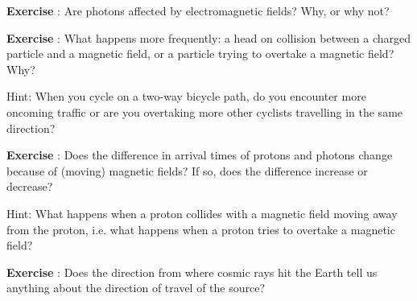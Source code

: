 \begin{shaded}
\textbf{Exercise \theExercise {}} : Are photons affected by electromagnetic fields? Why, or why not?\end{shaded}
\begin{shaded}
\textbf{Exercise \theExercise {}} : What happens more frequently: a head on collision between a charged particle and a magnetic field, or a particle trying to overtake a magnetic field? Why?

Hint: When you cycle on a two-way bicycle path, do you encounter more oncoming traffic or are you overtaking more other cyclists travelling in the same direction?
\end{shaded}
\begin{shaded}
\textbf{Exercise \theExercise {}} : Does the difference in arrival times of protons and photons change because of (moving) magnetic fields? If so, does the difference increase or decrease?

Hint: What happens when a proton collides with a magnetic field moving away from the proton, i.e. what happens when a proton tries to overtake a magnetic field?\end{shaded}
\begin{shaded}
\textbf{Exercise \theExercise {}} : Does the direction from where cosmic rays hit the Earth tell us anything about the direction of travel of the source?\end{shaded}


